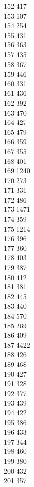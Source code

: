 { 152	417 \\
 153	607 \\
 154	254 \\
 155	431 \\
 156	363 \\
 157	435 \\
 158	367 \\
 159	446 \\
 160	331 \\
 161	436 \\
 162	392 \\
 163	470 \\
 164	427 \\
 165	479 \\
 166	359 \\
 167	355 \\
 168	401 \\
 169	1240 \\
 170	273 \\
 171	331 \\
 172	486 \\
 173	1471 \\
 174	359 \\
 175	1214 \\
 176	396 \\
 177	360 \\
 178	403 \\
 179	387 \\
 180	412 \\
 181	381 \\
 182	445 \\
 183	440 \\
 184	570 \\
 185	269 \\
 186	409 \\
 187	4422 \\
 188	426 \\
 189	468 \\
 190	427 \\
 191	328 \\
 192	377 \\
 193	439 \\
 194	422 \\
 195	386 \\
 196	433 \\
 197	344 \\
 198	460 \\
 199	380 \\
 200	432 \\
 201	357 \\
}
